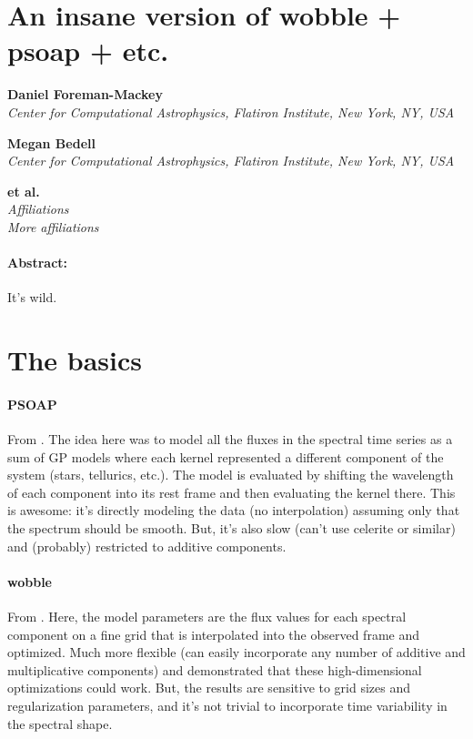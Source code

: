 \documentclass[10pt]{article}
\begin{document}
\section*{An insane version of wobble + psoap + etc.}

\noindent\textbf{Daniel Foreman-Mackey}\\
{\footnotesize%
\textsl{Center for Computational Astrophysics, Flatiron Institute, New York, NY, USA}%
}

\medskip\noindent\textbf{Megan Bedell}\\
{\footnotesize%
\textsl{Center for Computational Astrophysics, Flatiron Institute, New York, NY, USA}%
}

\medskip\noindent\textbf{et al.}\\
{\footnotesize%
\textsl{Affiliations}\\
\textsl{More affiliations}%
}

\paragraph{Abstract:}

It's wild.

\section{The basics}

\paragraph{PSOAP}

From \citet{Czekala:2017}.
The idea here was to model all the fluxes in the spectral time series as a sum of GP models where each kernel represented a different component of the system (stars, tellurics, etc.).
The model is evaluated by shifting the wavelength of each component into its rest frame and then evaluating the kernel there.
This is awesome: it's directly modeling the data (no interpolation) assuming only that the spectrum should be smooth.
But, it's also slow (can't use celerite or similar) and (probably) restricted to additive components.

\paragraph{wobble}

From \citet{Bedell:2019}.
Here, the model parameters are the flux values for each spectral component on a fine grid that is interpolated into the observed frame and optimized.
Much more flexible (can easily incorporate any number of additive and multiplicative components) and demonstrated that these high-dimensional optimizations could work.
But, the results are sensitive to grid sizes and regularization parameters, and it's not trivial to incorporate time variability in the spectral shape.
\end{document}
